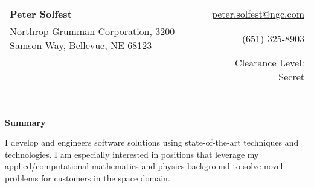 \documentclass[letterpaper,11pt]{article}
\makeatletter
\newcommand{\resheading}[1]{{\large \textbf{#1}}}
\newcommand{\email}{\href{mailto:peter.solfest@ngc.com}{peter.solfest@ngc.com}}
\newcommand{\address}{{\footnotesize Northrop Grumman Corporation, 3200 Samson Way, Bellevue, NE 68123}}
\newcommand{\phone}{(651) 325-8903}
\makeatother
\begin{document}
\newcommand{\mywebheader}{
\begin{tabular*}{7in}{l@{\extracolsep{\fill}}r}
  \textbf{\LARGE Peter Solfest} & \email \\
    \address & \phone  \\
  & Clearance Level: Secret
\end{tabular*}
\\
\vspace{0.1in}}

\mywebheader

\resheading{Summary}

  I develop and engineers software solutions using  state-of-the-art techniques and technologies.
  I am especially interested in positions that leverage my applied/computational mathematics and physics
  background to solve novel problems for customers in the space domain.

  \vspace{0.1in}
\end{document}

